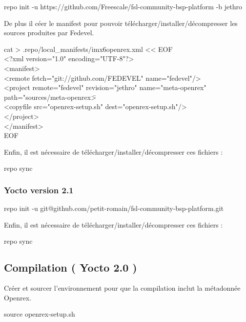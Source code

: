 \begin{tcolorbox}
	repo init -u https://github.com/Freescale/fsl-community-bsp-platform -b jethro
\end{tcolorbox}

De plus il céer le manifest pour pouvoir télécharger/installer/décompresser les sources produites par Fedevel.

\begin{tcolorbox}
	cat > .repo/local\_manifests/imx6openrex.xml << EOF \\
	<?xml version="1.0" encoding="UTF-8"?> \\
	<manifest> \\
	<remote fetch="git://github.com/FEDEVEL" name="fedevel"/> \\
	<project remote="fedevel" revision="jethro" name="meta-openrex" path="sources/meta-openrex\"> \\
	<copyfile src="openrex-setup.sh" dest="openrex-setup.sh"/> \\
	</project> \\
	</manifest> \\
	EOF
\end{tcolorbox}

Enfin, il est nécessaire de télécharger/installer/décompresser ces fichiers :

\begin{tcolorbox}
	repo sync
\end{tcolorbox}

\subsubsection{Yocto version 2.1}
\begin{tcolorbox}
	repo init -u git@github.com/petit-romain/fsl-community-bsp-platform.git
\end{tcolorbox}

Enfin, il est nécessaire de télécharger/installer/décompresser ces fichiers :

\begin{tcolorbox}
	repo sync
\end{tcolorbox}

\subsection{Compilation ( Yocto 2.0 )}

Créer et sourcer l'environnement pour que la compilation inclut la métadonnée Openrex.

\begin{tcolorbox}
	source openrex-setup.sh
\end{tcolorbox}

